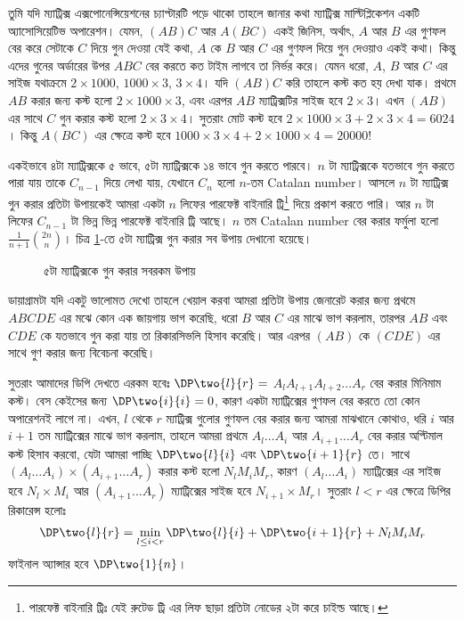 \begin{solution}
  তুমি যদি ম্যাট্রিক্স এক্সপোনেন্সিয়েশনের চ্যাপ্টারটি পড়ে থাকো তাহলে জানার
  কথা ম্যাট্রিক্স মাল্টিপ্লিকেশন একটি অ্যাসোসিয়েটিভ অপারেশন। যেমন, $(AB)C$ আর
  $A(BC)$ একই জিনিস, অর্থাৎ, $A$ আর $B$ এর গুণফল বের করে সেটাকে $C$ দিয়ে গুন
  দেওয়া যেই কথা, $A$ কে $B$ আর $C$ এর গুণফল দিয়ে গুন দেওয়াও একই কথা। কিন্তু
  এদের গুনের অর্ডারের উপর $ABC$ বের করতে কত টাইম লাগবে তা নির্ভর করে। যেমন
  ধরো, $A$, $B$ আর $C$ এর সাইজ যথাক্রমে $2 \times 1000$, $1000 \times 3$, $3
  \times 4$। যদি $(AB)C$ করি তাহলে কস্ট কত হয় দেখা যাক। প্রথমে $AB$
  করার জন্য কস্ট হলো $2 \times 1000 \times 3$, এবং এরপর $AB$ ম্যাট্রিক্সটির
  সাইজ হবে $2 \times 3$। এখন $(AB)$ এর সাথে $C$ গুন করার কস্ট হলো $2 \times 3
  \times 4$। সুতরাং মোট কস্ট হবে $2 \times 1000 \times 3 + 2 \times 3
  \times 4 = 6024$। কিন্তু $A(BC)$ এর ক্ষেত্রে কস্ট হবে $1000 \times 3 \times
  4 + 2 \times 1000 \times 4 = 20000$!

  একইভাবে ৪টা ম্যাট্রিক্সকে ৫ ভাবে, ৫টা ম্যাট্রিক্সকে ১৪ ভাবে গুন করতে পারবে।
  $n$ টা ম্যাট্রিক্সকে যতভাবে গুন করতে পারা যায় তাকে $C_{n-1}$ দিয়ে লেখা যায়,
  যেখানে $C_n$ হলো $n$-তম Catalan number। আসলে $n$ টা ম্যাট্রিক্স গুন করার
  প্রতিটা উপায়কেই আমরা একটা $n$ লিফের পারফেক্ট বাইনারি ট্রি\footnote{পারফেক্ট
  বাইনারি ট্রিঃ যেই রুটেড ট্রি এর লিফ ছাড়া প্রতিটা নোডের ২টা করে চাইল্ড আছে।
  } দিয়ে প্রকাশ করতে পারি। আর $n$ টা লিফের $C_{n-1}$ টা ভিন্ন ভিন্ন পারফেক্ট
  বাইনারি ট্রি আছে। $n$ তম Catalan number বের করার ফর্মুলা হলো $\frac{1}{n+1}
  \binom{2n}{n}$। চিত্র \ref{perfect_binary_trees_with_5_leaves}-তে ৫টা
  ম্যাট্রিক্স গুন করার সব উপায় দেখানো হয়েছে।
  \begin{figure}
    \centering
    
    \caption{৫টা ম্যাট্রিক্সকে গুন করার সবরকম উপায়}
    \label{perfect_binary_trees_with_5_leaves}
  \end{figure}

  ডায়াগ্রামটা যদি একটু ভালোমত দেখো তাহলে খেয়াল করবা আমরা প্রতিটা উপায় জেনারেট
  করার জন্য প্রথমে $ABCDE$ এর মঝে কোন এক জায়গায় ভাগ করেছি, ধরো $B$ আর $C$ এর
  মাঝে ভাগ করলাম, তারপর $AB$ এবং $CDE$ কে যতভাবে গুন করা যায় তা রিকারসিভলি
  হিসাব করেছি। আর এরপর $(AB)$ কে $(CDE)$ এর সাথে গুণ করার জন্য বিবেচনা করেছি।

  সুতরাং আমাদের ডিপি দেখতে এরকম হবেঃ $\DP \two{l}{r} = $ $A_l A_{l+1} A_{l+2}
  \dots A_{r}$ বের করার মিনিমাম কস্ট। বেস কেইসের জন্য $\DP \two{i}{i} = 0$,
  কারণ একটা ম্যাট্রিক্সের গুণফল বের করতে তো কোন অপারেশনই লাগে না। এখন, $l$
  থেকে $r$ ম্যাট্রিক্স গুলোর গুণফল বের করার জন্য আমরা মাঝখানে কোথাও, ধরি $i$
  আর $i+1$ তম ম্যাট্রিক্সের মাঝে ভাগ করলাম, তাহলে আমরা প্রথমে $A_l \dots A_i$
  আর $A_{i+1} \dots A_{r}$ বের করার অপ্টিমাল কস্ট হিসাব করবো, যেটা আমরা
  পাচ্ছি $\DP\two{l}{i}$ এবং $\DP\two{i+1}{r}$ তে। সাথে $(A_l \dots A_{i})
  \times (A_{i+1} \dots A_{r})$ করার কস্ট হলো $N_l M_i M_r$, কারণ $(A_l \dots
  A_{i})$ ম্যাট্রিক্সের এর সাইজ হবে $N_l \times M_i$ আর $(A_{i+1} \dots A_r)$
  ম্যাট্রিক্সের সাইজ হবে $N_{i+1} \times M_r$। সুতরাং $l < r$ এর ক্ষেত্রে
  ডিপির রিকারেন্স হলোঃ
  \[
    \DP\two{l}{r} = \min_{l \le i < r} \DP\two{l}{i} + \DP\two{i+1}{r} + N_l
    M_i M_r
  \]
  ফাইনাল অ্যান্সার হবে $\DP\two{1}{n}$।
\end{solution}

